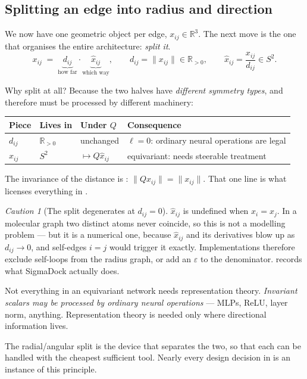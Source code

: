 \documentclass[11pt,a4paper]{report}
\theoremstyle{definition}
\theoremstyle{remark}
\newtheorem{caution}[caution]{Caution}
\newcommand{\RR}{\mathbb R}
\begin{document}
\subsection{Splitting an edge into radius and direction}
\label{sec:radial-angular-split}

We now have one geometric object per edge, $x_{ij}\in\RR^3$. The next move is
the one that organises the entire architecture: \emph{split it}.
\begin{equation}
\label{eq:edge-split}
x_{ij} \;=\; \underbrace{d_{ij}}_{\text{how far}}\cdot\underbrace{\hat x_{ij}}_{\text{which way}},
\qquad
d_{ij}=\|x_{ij}\|\in\RR_{>0},
\qquad
\hat x_{ij}=\frac{x_{ij}}{d_{ij}}\in S^2 .
\end{equation}

Why split at all? Because the two halves have \emph{different symmetry
types}, and therefore must be processed by different machinery:

\begin{center}
\begin{tabular}{lllp{4.6cm}}
\toprule
Piece & Lives in & Under $Q$ & Consequence \\
\midrule
$d_{ij}$ & $\RR_{>0}$ & unchanged & $\ell=0$: ordinary neural operations are legal \\
$\hat x_{ij}$ & $S^2$ & $\mapsto Q\hat x_{ij}$ & equivariant: needs steerable treatment \\
\bottomrule
\end{tabular}
\end{center}

The invariance of the distance is :
$\|Qx_{ij}\|=\|x_{ij}\|$. That one line is what licenses everything in
.

\begin{caution}[The split degenerates at $d_{ij}=0$]
\label{caution:zero-distance}
$\hat x_{ij}$ is undefined when $x_i=x_j$. In a molecular graph two distinct
atoms never coincide, so this is not a modelling problem --- but it is a
numerical one, because $\hat x_{ij}$ and its derivatives blow up as
$d_{ij}\to0$, and self-edges $i=j$ would trigger it exactly. Implementations
therefore exclude self-loops from the radius graph, or add an
$\varepsilon$ to the denominator.  records what
SigmaDock actually does.
\end{caution}

\begin{tcolorbox}[colback=green!3,colframe=green!35!black,title={The organising principle}]
Not everything in an equivariant network needs representation theory.
\emph{Invariant scalars may be processed by ordinary neural operations} ---
MLPs, ReLU, layer norm, anything. Representation theory is needed only where
directional information lives.

The radial/angular split is the device that separates the two, so that each
can be handled with the cheapest sufficient tool. Nearly every design
decision in  is an instance of this principle.
\end{tcolorbox}
\end{document}
